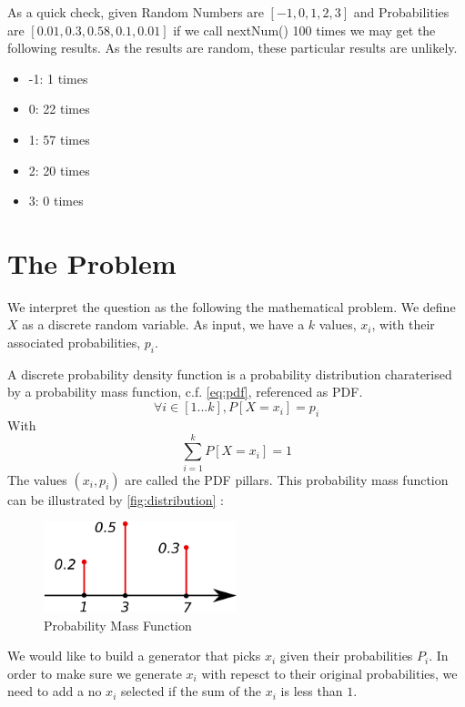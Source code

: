 \documentclass[12pt,a4paper,article]{memoir} %
\begin{document}
As a quick check, given Random Numbers are $[-1, 0, 1, 2, 3]$ and 
Probabilities are $[0.01, 0.3, 0.58, 0.1, 0.01]$ if we call nextNum() 100 times 
we may get the following results. As the results are random, these particular results are unlikely.
\begin{itemize}
	\item -1: 1 times 
	\item 0: 22 times
	\item 1: 57 times 
	\item 2: 20 times
	\item 3: 0 times 
\end{itemize}

\section{The Problem}
\label{sec:problem}
We interpret the question as the following the mathematical problem. 
We define $X$ as a discrete random variable. 
As input, we have a $k$ values, $x_i$, with their associated probabilities, $p_i$.

A discrete probability density function is a probability distribution charaterised 
by a probability mass function, c.f. \autoref{eq:pdf}, referenced as PDF.
\begin{equation}
	\forall i \in \left[1 ...  k\right], P\left[ X = x_i \right] = p_i  
	\label{eq:pdf}
\end{equation}
With
\[ 
	\sum_{i = 1}^k  P\left[ X = x_i \right]  = 1
\]
The values $\left(x_i, p_i\right)$ are called the PDF pillars.
This probability mass function can be illustrated by \autoref{fig:distribution} :
\begin{figure}[h!]
\begin{center}
\includegraphics[width=0.5\textwidth]{img/distribution.png}
\caption{Probability Mass Function}
\label{fig:distribution}
\end{center}
\end{figure}

We would like to build a generator that picks $x_i$ given their probabilities
$P_i$. 
In order to make sure we generate $x_i$ with repesct to their original probabilities, 
we need to add a no $x_i$ selected if the sum of the $x_i$ is less than $1$.
\end{document}
